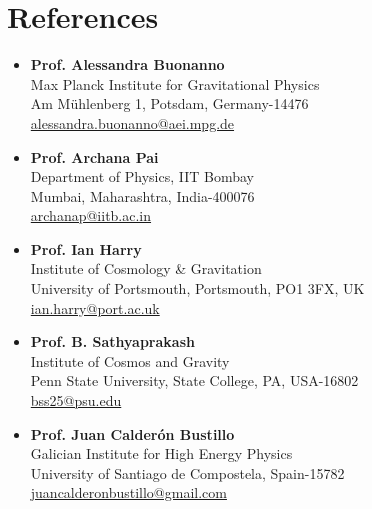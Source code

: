 \section{References}

\vspace{1em}

\begin{minipage}[t]{0.48\textwidth}
\begin{itemize}
\item \textbf{Prof. Alessandra Buonanno}\\
Max Planck Institute for Gravitational Physics\\
Am Mühlenberg 1, Potsdam, Germany-14476\\
\href{mailto:alessandra.buonanno@aei.mpg.de}{alessandra.buonanno@aei.mpg.de}

\item \textbf{Prof. Archana Pai}\\
Department of Physics, IIT Bombay\\
Mumbai, Maharashtra, India-400076\\
\href{mailto:archanap@iitb.ac.in}{archanap@iitb.ac.in}

\item \textbf{Prof. Ian Harry}\\
Institute of Cosmology \& Gravitation\\
University of Portsmouth, Portsmouth, PO1 3FX, UK\\
\href{mailto:ian.harry@port.ac.uk}{ian.harry@port.ac.uk}
\end{itemize}
\end{minipage}%
\hfill%
\begin{minipage}[t]{0.48\textwidth}
\begin{itemize}
\item \textbf{Prof. B. Sathyaprakash}\\
Institute of Cosmos and Gravity\\
Penn State University, State College, PA, USA-16802\\
\href{mailto:bss25@psu.edu}{bss25@psu.edu}

\item \textbf{Prof. Juan Calderón Bustillo}\\
Galician Institute for High Energy Physics\\
University of Santiago de Compostela, Spain-15782\\
\href{mailto:juancalderonbustillo@gmail.com}{juancalderonbustillo@gmail.com}
\end{itemize}
\end{minipage}